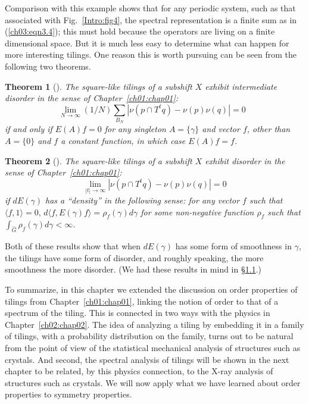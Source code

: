 \documentclass[reqno]{stml-l}
\theoremstyle{plain}
\newtheorem{theorem}{Theorem}[chapter]
\theoremstyle{definition}
\numberwithin{equation}{chapter}
\begin{document}
Comparison with this example shows that for any periodic
system, such as that associated with Fig.~\ref{Intro:fig4},
the spectral representation is a finite sum as in
(\ref{ch03:eqn3.4}); this must hold because the operators
are living on a finite dimensional space. But it is much
less easy to determine what can happen for more interesting
tilings. One reason this is worth pursuing can be seen from
the following two theorems.

\begin{theorem}[{\cite[p. 48]{bib:Wal}}]\label{ch03:thm3.2}
The square-like tilings of a subshift $X$ exhibit intermediate disorder in the sense of Chapter~\ref{ch01:chap01}:
\begin{equation}
\lim_{N\rightarrow\infty}(1/N)\sum\limits_{B_{N}}|\nu(p\cap T^{t}q)-\nu(p)\nu(q)|=0\text{ }\label{ch03:eqn3.6}
\end{equation}if and only if $E(A)f=0$ for any singleton $A=\{\gamma\}$ and vector $f$, other than $A=\{0\}$ and $f$ a constant function, in which case $E(A)f=f$.
\end{theorem}
\begin{theorem}[{\cite[p. 66]{bib:Wal}}]\label{ch03:thm3.3}
The square-like tilings of a subshift $X$ exhibit disorder in the sense of Chapter~\ref{ch01:chap01}:
\begin{equation}
\lim_{|t|\rightarrow\infty}|\nu(p\cap T^{t}q)-\nu(p)\nu(q)|=0\label{ch03:eqn3.7}
\end{equation}
if $dE(\gamma)$ has a ``density'' in the following sense: for any vector $f$ such that $\langle f,1\rangle=0,\,d\langle f, E(\gamma)f\rangle=\rho_{f}(\gamma)d\gamma$ for some non-negative function $\rho_{f}$ such that $\int_{\hat{G}}\rho_{f}(\gamma)d\gamma<\infty$.
\end{theorem}

Both of these results show that when $dE(\gamma)$ has some form of smoothness in $\gamma$, the tilings have some form of disorder, and roughly speaking, the more smoothness the more disorder. (We had these results in mind in \S \hyperref[ch01:sec1]{1.1}.)

To summarize, in this chapter we extended the discussion on order properties of tilings from Chapter~\ref{ch01:chap01}, linking the notion of order to that of a spectrum of the tiling. This is connected in two ways with the physics in Chapter~\ref{ch02:chap02}. The idea of analyzing a tiling by embedding it in a family of tilings, with a probability distribution on the family, turns out to be natural from the point of view of the statistical mechanical analysis of structures such as crystals. And second, the spectral analysis of tilings will be shown in the next chapter to be related, by this physics connection, to the X-ray analysis of structures such as crystals. We will now apply what we have learned about order properties to symmetry properties.
\end{document}
